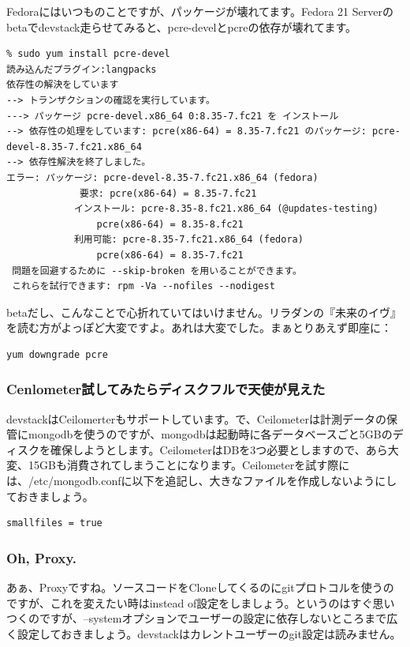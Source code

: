 \documentclass[8pt,b5paper,tombo,openany]{jsbook}
\begin{document}
Fedoraにはいつものことですが、パッケージが壊れてます。Fedora 21 Serverのbetaでdevstack走らせてみると、pcre-develとpcreの依存が壊れてます。

\begin{lstlisting}
% sudo yum install pcre-devel
読み込んだプラグイン:langpacks
依存性の解決をしています
--> トランザクションの確認を実行しています。
---> パッケージ pcre-devel.x86_64 0:8.35-7.fc21 を インストール
--> 依存性の処理をしています: pcre(x86-64) = 8.35-7.fc21 のパッケージ: pcre-devel-8.35-7.fc21.x86_64
--> 依存性解決を終了しました。
エラー: パッケージ: pcre-devel-8.35-7.fc21.x86_64 (fedora)
             要求: pcre(x86-64) = 8.35-7.fc21
            インストール: pcre-8.35-8.fc21.x86_64 (@updates-testing)
                pcre(x86-64) = 8.35-8.fc21
            利用可能: pcre-8.35-7.fc21.x86_64 (fedora)
                pcre(x86-64) = 8.35-7.fc21
 問題を回避するために --skip-broken を用いることができます。
 これらを試行できます: rpm -Va --nofiles --nodigest
\end{lstlisting}

betaだし、こんなことで心折れていてはいけません。リラダンの『未来のイヴ』を読む方がよっぽど大変ですよ。あれは大変でした。まぁとりあえず即座に：

\begin{lstlisting}
yum downgrade pcre
\end{lstlisting}

\subsubsection{Cenlometer試してみたらディスクフルで天使が見えた}

devstackはCeilomerterもサポートしています。で、Ceilometerは計測データの保管にmongodbを使うのですが、mongodbは起動時に各データベースごと5GBのディスクを確保しようとします。CeilometerはDBを3つ必要としますので、あら大変、15GBも消費されてしまうことになります。Ceilometerを試す際には、/etc/mongodb.confに以下を追記し、大きなファイルを作成しないようにしておきましょう。

\begin{lstlisting}
smallfiles = true
\end{lstlisting}

\subsubsection{Oh, Proxy.}

あぁ、Proxyですね。ソースコードをCloneしてくるのにgitプロトコルを使うのですが、これを変えたい時はinstead of設定をしましょう。というのはすぐ思いつくのですが、--systemオプションでユーザーの設定に依存しないところまで広く設定しておきましょう。devstackはカレントユーザーのgit設定は読みません。
\end{document}
